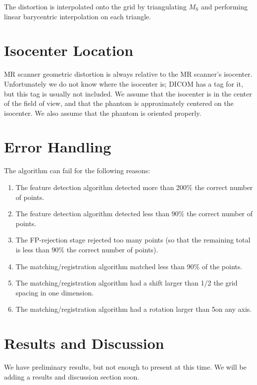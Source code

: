 \documentclass[12pt]{article}
\begin{document}
The distortion is interpolated onto the grid by triangulating $M_\textrm{S}$ and performing linear barycentric interpolation on each triangle.

\section{Isocenter Location}

MR scanner geometric distortion is always relative to the MR scanner's isocenter.  Unfortunately we do not know where the isocenter is; DICOM has a tag for it, but this tag is usually not included.  We assume that the isocenter is in the center of the field of view, and that the phantom is approximately centered on the isocenter.  We also assume that the phantom is oriented properly.

\section{Error Handling}

The algorithm can fail for the following reasons:

\begin{enumerate}
\item The feature detection algorithm detected more than 200\% the correct number of points.
\item The feature detection algorithm detected less than 90\% the correct number of points.
\item The FP-rejection stage rejected too many points (so that the remaining total is less than 90\% the correct number of points).
\item The matching/registration algorithm matched less than 90\% of the points.
\item The matching/registration algorithm had a shift larger than 1/2 the grid spacing in one dimension.
\item The matching/registration algorithm had a rotation larger than 5\degrees on any axis.
\end{enumerate}

\section{Results and Discussion}

We have preliminary results, but not enough to present at this time.  We will be adding a results and discussion section soon.



\end{document}
